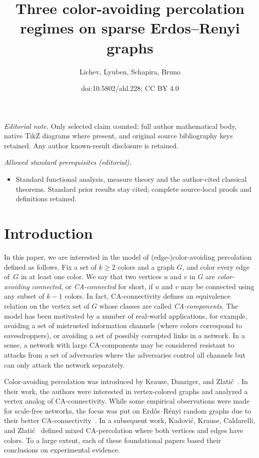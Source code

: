\documentclass[10pt]{amsart}
\title{Three color-avoiding percolation regimes on sparse Erdos--Renyi graphs}
\author{Lichev, Lyuben, Schapira, Bruno}
\date{doi:10.5802/ahl.228; CC BY 4.0}
\theoremstyle{definition}\newtheorem{defi}[theo]{Definition}\newtheorem{rema}[theo]{Remark}\newtheorem{exam}[theo]{Example}\newtheorem{exem}[theo]{Example}\newtheorem{nota}[theo]{Notation}
\begin{document}
\maketitle
\noindent\textit{Editorial note.} Only selected claim counted; full author mathematical body, native TikZ diagrams where present, and original source bibliography keys retained. Any author known-result disclosure is retained.\par\medskip
\noindent\textit{Allowed standard prerequisites (editorial).}\begin{itemize}
\item Standard functional analysis, measure theory and the author-cited classical theorems. Standard prior results stay cited; complete source-local proofs and definitions retained.
\end{itemize}\medskip

\section{Introduction}

In this paper, we are interested in the model of (edge-)color-avoiding percolation defined as follows. Fix a set of $k\ge 2$ colors and a graph $G$, and color every edge of~$G$ in at least one color. We say that two vertices $u$ and $v$ in $G$ are \emph{color-avoiding connected}, or \emph{CA-connected} for short, if $u$ and $v$ may be connected using any subset of $k-1$ colors. In fact, CA-connectivity defines an equivalence relation on the vertex set of $G$ whose classes are called \emph{CA-components}. The model has been motivated by a number of real-world applications, for example, avoiding a set of mistrusted information channels (where colors correspond to eavesdroppers), or avoiding a set of possibly corrupted links in a network. In a sense, a network with large CA-components may be considered resistant to attacks from a set of adversaries where the adversaries control all channels but can only attack the network separately.

Color-avoiding percolation was introduced by Krause, Danziger, and Zlati\'c~\cite{KDZ16, KDZ17}. In their work, the authors were interested in vertex-colored graphs and analyzed a vertex analog of CA-connectivity. While some empirical observations were made for scale-free networks, the focus was put on Erd\H{o}s--Rényi random graphs due to their better CA-connectivity~\cite{KDZ16}. In a subsequent work, Kadovi\'c, Krause, Caldarelli, and Zlati\'c~\cite{KKCZ18} defined mixed CA-percolation where both vertices and edges have colors. To a large extent, each of these foundational papers based their conclusions on experimental evidence.
\end{document}
